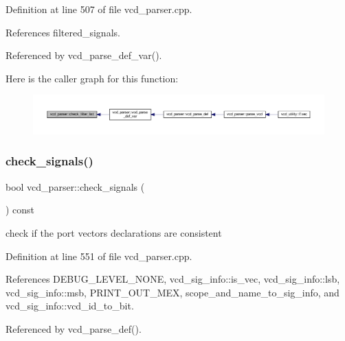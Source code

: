 Definition at line 507 of file vcd\+\_\+parser.\+cpp.



References filtered\+\_\+signals.



Referenced by vcd\+\_\+parse\+\_\+def\+\_\+var().

Here is the caller graph for this function\+:
\nopagebreak
\begin{figure}[H]
\begin{center}
\leavevmode
\includegraphics[width=350pt]{d2/d25/classvcd__parser_a493834428198caf956a97a730693b3d2_icgraph}
\end{center}
\end{figure}
\mbox{\label{classvcd__parser_a094db21ee543d294fda6891691016dee}} 
\subsubsection{\texorpdfstring{check\+\_\+signals()}{check\_signals()}}
{\footnotesize\ttfamily bool vcd\+\_\+parser\+::check\+\_\+signals (\begin{DoxyParamCaption}{ }\end{DoxyParamCaption}) const\hspace{0.3cm}{\ttfamily [private]}}



check if the port vectors declarations are consistent 



Definition at line 551 of file vcd\+\_\+parser.\+cpp.



References D\+E\+B\+U\+G\+\_\+\+L\+E\+V\+E\+L\+\_\+\+N\+O\+NE, vcd\+\_\+sig\+\_\+info\+::is\+\_\+vec, vcd\+\_\+sig\+\_\+info\+::lsb, vcd\+\_\+sig\+\_\+info\+::msb, P\+R\+I\+N\+T\+\_\+\+O\+U\+T\+\_\+\+M\+EX, scope\+\_\+and\+\_\+name\+\_\+to\+\_\+sig\+\_\+info, and vcd\+\_\+sig\+\_\+info\+::vcd\+\_\+id\+\_\+to\+\_\+bit.



Referenced by vcd\+\_\+parse\+\_\+def().

